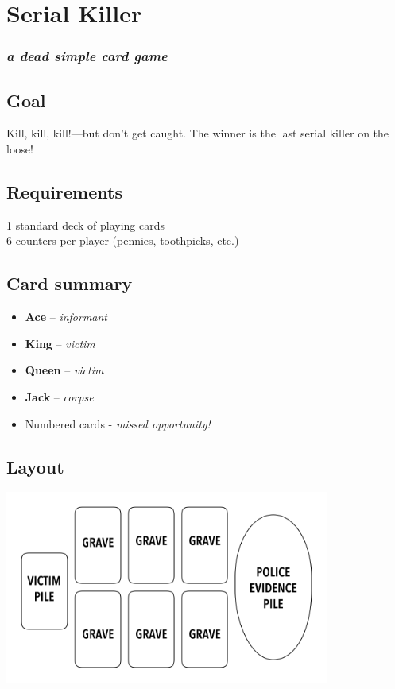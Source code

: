 \documentclass[]{article}
\date{}
\begin{document}
\section{Serial Killer}\label{serial-killer}

\subsubsection{\texorpdfstring{\emph{a dead simple card
game}}{a dead simple card game}}\label{a-dead-simple-card-game}

\subsection{Goal}\label{goal}

Kill, kill, kill!---but don't get caught. The winner is the last serial
killer on the loose!

\subsection{Requirements}\label{requirements}

1 standard deck of playing cards\\6 counters per player (pennies,
toothpicks, etc.)

\subsection{Card summary}\label{card-summary}

\begin{itemize}
\itemsep1pt\parskip0pt
\item
  \textbf{Ace} -- \emph{informant}
\item
  \textbf{King} -- \emph{victim}
\item
  \textbf{Queen} -- \emph{victim}
\item
  \textbf{Jack} -- \emph{corpse}
\item
  Numbered cards - \emph{missed opportunity!}
\end{itemize}

\subsection{Layout}\label{layout}

\includegraphics[width=0.8\textwidth]{img/serialkiller.png}
\end{document}
